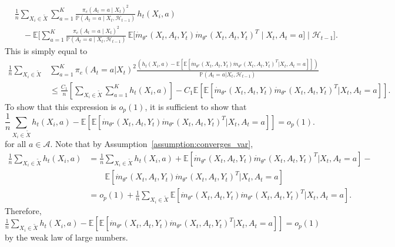 \documentclass[11pt]{article}
\newcommand{\E}{\mathbb{E}}
\begin{document}
\begin{appendix}
\begin{align*}
&\frac{1}{n} \sum_{X_i \in \tilde{X}} \sum_{a=1}^{K}
\frac{\pi_{e}(A_{t}=a \mid X_{t})^{2}}
{\mathbb{P}\!\left(A_{t}=a \mid X_{t}, \mathcal{H}_{t-1}\right)}
\, h_t(X_i,a) \\
&\quad - \E\Bigg[
\sum_{a=1}^{K}
\frac{\pi_{e}(A_{t}=a \mid X_{t})^{2}}
{\mathbb{P}\!\left(A_{t}=a \mid X_{t}, \mathcal{H}_{t-1}\right)}
\, \E\Big[
\dot{m}_{\theta^{\star}}(X_t,A_t,Y_t)
\dot{m}_{\theta^{\star}}(X_t,A_t,Y_t)^{T}
\;\Big|\; X_t, A_t=a
\Big]
\;\Big|\; \mathcal{H}_{t-1}
\Bigg].
\end{align*}
This is simply equal to 
\begin{align*}
  \frac{1}{n} \sum_{X_i \in \tilde{X}} &\sum_{a=1}^{K} \pi_{e}(A_{t} =a | X_{t})^{2} \frac{ \left( h_t(X_i,a)  -  \E\left[\E \left[  \dot{m}_{\theta^{\star}}(X_t,A_t,Y_{t})\dot{m}_{\theta^{\star}}(X_t,A_t,Y_{t})^{T} | X_{t},A_t=a \right]\right] \right) }{ \mathbb{P} \left(A_{t}=a| X_{t}, \mathcal{H}_{t-1}\right)}  \\
  &\le \frac{C_1}{n} \left[\sum_{X_i \in \tilde{X}}\sum_{a=1}^{K} h_t(X_i,a)\right] -C_1\E\left[\E \left[  \dot{m}_{\theta^{\star}}(X_t,A_t,Y_{t})\dot{m}_{\theta^{\star}}(X_t,A_t,Y_{t})^{T} | X_{t},A_t=a \right]\right].
\end{align*}
To show that this expression is $o_{p}(1)$, it is sufficient to show that $$ \frac{1}{n}\sum_{X_i \in \tilde{X}} h_t(X_i,a) - \E\left[\E \left[  \dot{m}_{\theta^{\star}}(X_t,A_t,Y_{t})\dot{m}_{\theta^{\star}}(X_t,A_t,Y_{t})^{T} | X_{t},A_t=a \right]\right] =o_{p}(1).$$ for all $a\in \mathcal{A}$. Note that by Assumption~\ref{assumption:converges_var},
\begin{align*}
   \frac{1}{n}\sum_{X_i \in \tilde{X}} h_t(X_i,a) &=    \frac{1}{n}\sum_{X_i \in \tilde{X}} h_t(X_i,a)  + \E \left[  \dot{m}_{\theta^{\star}}(X_t,A_t,Y_{t})\dot{m}_{\theta^{\star}}(X_t,A_t,Y_{t})^{T} | X_{t},A_t=a \right] - \\
   &\qquad \E \left[  \dot{m}_{\theta^{\star}}(X_t,A_t,Y_{t})\dot{m}_{\theta^{\star}}(X_t,A_t,Y_{t})^{T} | X_{t},A_t=a \right]\\
   &= o_{p}(1) + \frac{1}{n}\sum_{X_i \in \tilde{X}} \E \left[  \dot{m}_{\theta^{\star}}(X_t,A_t,Y_{t})\dot{m}_{\theta^{\star}}(X_t,A_t,Y_{t})^{T} | X_{t},A_t=a \right].
\end{align*}
Therefore,  $ \frac{1}{n}\sum_{X_i \in \tilde{X}} h_t(X_i,a) - \E\left[\E \left[  \dot{m}_{\theta^{\star}}(X_t,A_t,Y_{t})\dot{m}_{\theta^{\star}}(X_t,A_t,Y_{t})^{T} | X_{t},A_t=a \right]\right] =o_{p}(1)$ by the weak law of large numbers. 


\end{appendix}
\end{document}
